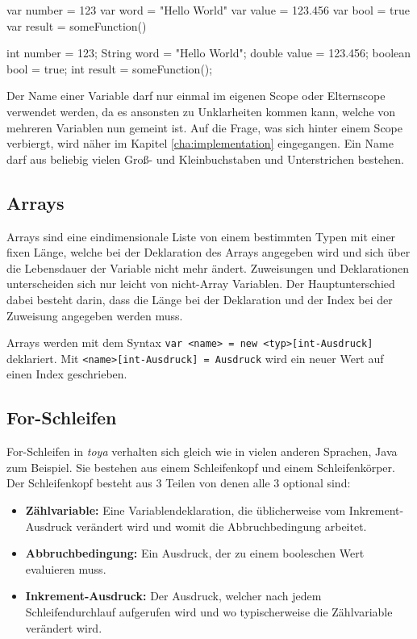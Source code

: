 \begin{ToyaCode}[numbers=none, caption={Variablendeklaration in toya}]
var number = 123
var word = "Hello World"
var value = 123.456
var bool = true
var result = someFunction()
\end{ToyaCode}

\begin{JavaCode}[numbers=none,caption={Variablendeklaration in Java (vor Version 10)}]
int number = 123;
String word = "Hello World";
double value = 123.456;
boolean bool = true;
int result = someFunction();
\end{JavaCode}

Der Name einer Variable darf nur einmal im eigenen Scope oder Elternscope verwendet werden, da es ansonsten zu Unklarheiten kommen kann, welche von mehreren Variablen nun gemeint ist. Auf die Frage, was sich hinter einem Scope verbiergt, wird näher im Kapitel \ref{cha:implementation} eingegangen. Ein Name darf aus beliebig vielen Groß- und Kleinbuchstaben und Unterstrichen bestehen. 

\subsection{Arrays}

Arrays sind eine eindimensionale Liste von einem bestimmten Typen mit einer fixen Länge, welche bei der Deklaration des Arrays angegeben wird und sich über die Lebensdauer der Variable nicht mehr ändert. Zuweisungen und Deklarationen unterscheiden sich nur leicht von nicht-Array Variablen. Der Hauptunterschied dabei besteht darin, dass die Länge bei der Deklaration und der Index bei der Zuweisung angegeben werden muss.

Arrays werden mit dem Syntax \texttt{var <name> = new <typ>[int-Ausdruck]} deklariert. Mit \texttt{<name>[int-Ausdruck] = Ausdruck} wird ein neuer Wert auf einen Index geschrieben.

\subsection{For-Schleifen}

For-Schleifen in \textit{toya} verhalten sich gleich wie in vielen anderen Sprachen, Java zum Beispiel. Sie bestehen aus einem Schleifenkopf und einem Schleifenkörper. Der Schleifenkopf besteht aus 3 Teilen von denen alle 3 optional sind:
\begin{itemize}
    \item \textbf{Zählvariable:} Eine Variablendeklaration, die üblicherweise vom Inkrement-\\Ausdruck verändert wird und womit die Abbruchbedingung arbeitet.
    \item \textbf{Abbruchbedingung:} Ein Ausdruck, der zu einem booleschen Wert evaluieren muss.
    \item \textbf{Inkrement-Ausdruck:} Der Ausdruck, welcher nach jedem Schleifendurchlauf aufgerufen wird und wo typischerweise die Zählvariable verändert wird.
\end{itemize}

